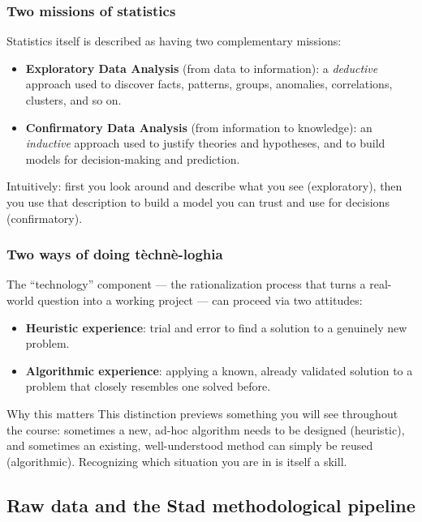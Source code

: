 \subsubsection{Two missions of statistics}

Statistics itself is described as having two complementary missions:
\begin{itemize}
  \item \textbf{Exploratory Data Analysis} (from data to information): a \textit{deductive} approach used to discover facts, patterns, groups, anomalies, correlations, clusters, and so on.
  \item \textbf{Confirmatory Data Analysis} (from information to knowledge): an \textit{inductive} approach used to justify theories and hypotheses, and to build models for decision-making and prediction.
\end{itemize}
Intuitively: first you look around and describe what you see (exploratory), then you use that description to build a model you can trust and use for decisions (confirmatory).

\subsubsection{Two ways of doing t\`echn\`e-loghia}

The ``technology'' component --- the rationalization process that turns a real-world question into a working project --- can proceed via two attitudes:
\begin{itemize}
  \item \textbf{Heuristic experience}: trial and error to find a solution to a genuinely new problem.
  \item \textbf{Algorithmic experience}: applying a known, already validated solution to a problem that closely resembles one solved before.
\end{itemize}

\begin{noteboxtitle}{Why this matters}
This distinction previews something you will see throughout the course: sometimes a new, ad-hoc algorithm needs to be designed (heuristic), and sometimes an existing, well-understood method can simply be reused (algorithmic). Recognizing which situation you are in is itself a skill.
\end{noteboxtitle}

\subsection{Raw data and the Stad methodological pipeline}\label{sec:prolusion-pipeline}

